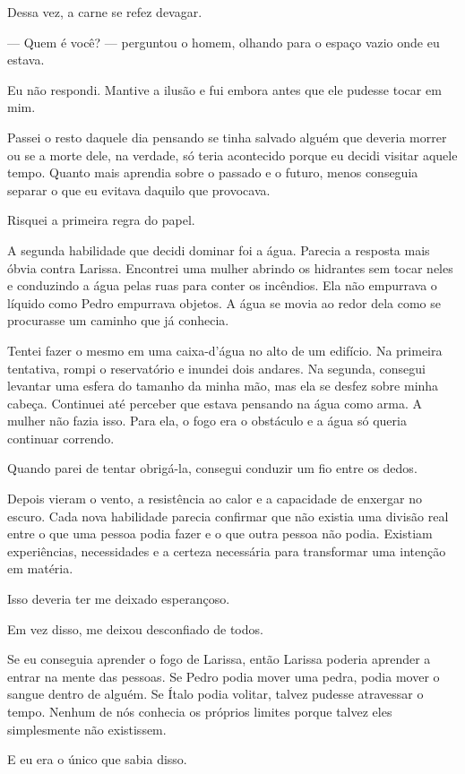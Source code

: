 Dessa vez, a carne se refez devagar.

— Quem é você? — perguntou o homem, olhando para o espaço vazio onde eu estava.

Eu não respondi. Mantive a ilusão e fui embora antes que ele pudesse tocar em mim.

Passei o resto daquele dia pensando se tinha salvado alguém que deveria morrer ou se a morte dele, na verdade, só teria acontecido porque eu decidi visitar aquele tempo. Quanto mais aprendia sobre o passado e o futuro, menos conseguia separar o que eu evitava daquilo que provocava.

Risquei a primeira regra do papel.

A segunda habilidade que decidi dominar foi a água. Parecia a resposta mais óbvia contra Larissa. Encontrei uma mulher abrindo os hidrantes sem tocar neles e conduzindo a água pelas ruas para conter os incêndios. Ela não empurrava o líquido como Pedro empurrava objetos. A água se movia ao redor dela como se procurasse um caminho que já conhecia.

Tentei fazer o mesmo em uma caixa-d'água no alto de um edifício. Na primeira tentativa, rompi o reservatório e inundei dois andares. Na segunda, consegui levantar uma esfera do tamanho da minha mão, mas ela se desfez sobre minha cabeça. Continuei até perceber que estava pensando na água como arma. A mulher não fazia isso. Para ela, o fogo era o obstáculo e a água só queria continuar correndo.

Quando parei de tentar obrigá-la, consegui conduzir um fio entre os dedos.

Depois vieram o vento, a resistência ao calor e a capacidade de enxergar no escuro. Cada nova habilidade parecia confirmar que não existia uma divisão real entre o que uma pessoa podia fazer e o que outra pessoa não podia. Existiam experiências, necessidades e a certeza necessária para transformar uma intenção em matéria.

Isso deveria ter me deixado esperançoso.

Em vez disso, me deixou desconfiado de todos.

Se eu conseguia aprender o fogo de Larissa, então Larissa poderia aprender a entrar na mente das pessoas. Se Pedro podia mover uma pedra, podia mover o sangue dentro de alguém. Se Ítalo podia volitar, talvez pudesse atravessar o tempo. Nenhum de nós conhecia os próprios limites porque talvez eles simplesmente não existissem.

E eu era o único que sabia disso.

